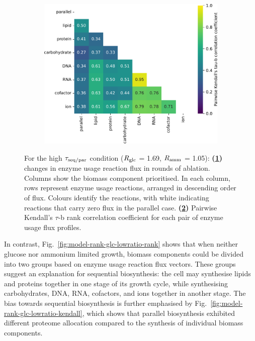 \begin{figure}[htbp!]
\begin{subfigure}[t]{0.45\textwidth}
    \caption{
    }
    \label{fig:model-rank-glc-highratio-rank}
  \end{subfigure}%
  \begin{subfigure}[t]{0.45\textwidth}
  \centering
    \includegraphics[width=\linewidth]{CompareEnzUse_glc01p69_pyrUnres_amm01p05_2.pdf}
    \caption{
    }
    \label{fig:model-rank-glc-highratio-kendall}
  \end{subfigure}%

  \caption[
    Changes in enzyme usage reaction flux and Kendall's $\tau$-b rank correlation coefficient for each pair, $\exchrate{glc}$ = \SI{1.69}{\mmolgdwh}, $\exchrate{amm}$ = \SI{1.05}{\mmolgdwh}.
    ]{
    For the high $\tau_{\mathrm{seq}/\mathrm{par}}$ condition ($\exchrate{glc}$ = \SI{1.69}{\mmolgdwh}, $\exchrate{amm}$ = \SI{1.05}{\mmolgdwh}):
    \textbf{(\ref{fig:model-rank-glc-highratio-rank})}
    changes in enzyme usage reaction flux in rounds of ablation.
    Columns show the biomass component prioritised.
    In each column, rows represent enzyme usage reactions, arranged in descending order of flux.
    Colours identify the reactions, with white indicating reactions that carry zero flux in the parallel case.
    \textbf{(\ref{fig:model-rank-glc-highratio-kendall})}
    Pairwise Kendall's $\tau$-b rank correlation coefficient \parencite{kendallTREATMENTTIESRANKING1945} for each pair of enzyme usage flux profiles.
  }
  \label{fig:model-rank-glc-highratio}
\end{figure}

In contrast, Fig.\ \ref{fig:model-rank-glc-lowratio-rank} shows that when neither glucose nor ammonium limited growth, biomass components could be divided into two groups based on enzyme usage reaction flux vectors.
These groups suggest an explanation for sequential biosynthesis: the cell may synthesise lipids and proteins together in one stage of its growth cycle, while synthesising carbohydrates, DNA, RNA, cofactors, and ions together in another stage.
The bias towards sequential biosynthesis is further emphasised by Fig.\ \ref{fig:model-rank-glc-lowratio-kendall}, which shows that parallel biosynthesis exhibited different proteome allocation compared to the synthesis of individual biomass components.

